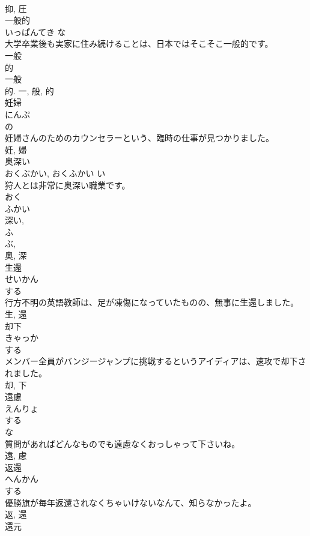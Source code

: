 \documentclass[8pt]{extreport}
\begin{document}
\begin{CJK}{UTF8}{min}
\\	抑, 圧	
\\	一般的	
\\	いっぱんてき	な 
\\	大学卒業後も実家に住み続けることは、日本ではそこそこ一般的です。	
\\	一般 
\\	的 
\\	一般 
\\	的.	一, 般, 的	
\\	妊婦	
\\	にんぷ	
\\	の 
\\	妊婦さんのためのカウンセラーという、臨時の仕事が見つかりました。	
\\	妊, 婦	
\\	奥深い	
\\	おくぶかい, おくふかい	い 
\\	狩人とは非常に奥深い職業です。	
\\	おく 
\\	ふかい 
\\	深い, 
\\	ふ 
\\	ぶ, 
\\	奥, 深	
\\	生還	
\\	せいかん	
\\	する 
\\	行方不明の英語教師は、足が凍傷になっていたものの、無事に生還しました。	
\\	生, 還	
\\	却下	
\\	きゃっか	
\\	する 
\\	メンバー全員がバンジージャンプに挑戦するというアイディアは、速攻で却下されました。	
\\	却, 下	
\\	遠慮	
\\	えんりょ	
\\	する 
\\	な 
\\	質問があればどんなものでも遠慮なくおっしゃって下さいね。	
\\	遠, 慮	
\\	返還	
\\	へんかん	
\\	する 
\\	優勝旗が毎年返還されなくちゃいけないなんて、知らなかったよ。	
\\	返, 還	
\\	還元	

\end{CJK}
\end{document}
